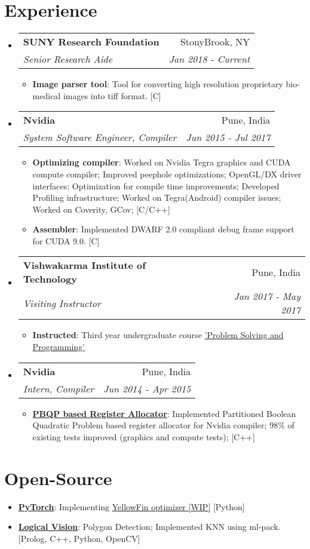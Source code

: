\documentclass[letterpaper,11pt]{article}
\makeatletter
\newcommand{\resumeItem}[2]{
  \item\small{
    \textbf{#1}{: #2 \vspace{-2pt}}
  }
}
\newcommand{\resumeSubheading}[4]{
  \vspace{-1pt}\item
    \begin{tabular*}{0.97\textwidth}{l@{\extracolsep{\fill}}r}
      \textbf{#1} & #2 \\
      \textit{\small#3} & \textit{\small #4} \\
    \end{tabular*}\vspace{-5pt}
}
\newcommand{\resumeSubItem}[2]{\resumeItem{#1}{#2}\vspace{-4pt}}
\newcommand{\resumeSubHeadingListStart}{\begin{itemize}[leftmargin=*]}
\newcommand{\resumeSubHeadingListEnd}{\end{itemize}}
\newcommand{\resumeItemListStart}{\begin{itemize}}
\newcommand{\resumeItemListEnd}{\end{itemize}\vspace{-5pt}}
\makeatother
\begin{document}
\section{Experience}
  \resumeSubHeadingListStart
  \resumeSubheading
      {SUNY Research Foundation}{StonyBrook, NY}
      {Senior Research Aide}{Jan 2018 - Current}
      \resumeItemListStart
        \resumeItem{Image parser tool}{Tool for converting high resolution proprietary bio-medical images into tiff format. [C]}
      \resumeItemListEnd
    \resumeSubheading
      {Nvidia}{Pune, India}
      {System Software Engineer, Compiler}{Jun 2015 - Jul 2017}
      \resumeItemListStart
        \resumeItem{Optimizing compiler} {Worked on Nvidia Tegra graphics and CUDA compute compiler; Improved peephole optimizations; OpenGL/DX driver interfaces; Optimization for compile time improvements; Developed Profiling infrastructure; Worked on Tegra(Android) compiler issues; Worked on Coverity, GCov; [C/C++]}
        \resumeItem{Assembler}{Implemented DWARF 2.0 compliant debug frame support for CUDA 9.0. [C]}
      \resumeItemListEnd
    \resumeSubheading
      {Vishwakarma Institute of Technology}{Pune, India}
      {Visiting Instructor}{Jan 2017 - May 2017}
      \resumeItemListStart
        \resumeItem {Instructed}
           {Third year undergraduate course \href{https://www.hackerrank.com/coding-puzzles/}{'Problem Solving and Programming'}}
      \resumeItemListEnd
    \resumeSubheading
      {Nvidia}{Pune, India}
      {Intern, Compiler}{Jun 2014 - Apr 2015}
      \resumeItemListStart
        \resumeItem{\href{http://slides.com/bhushansonawane/deck/}{ PBQP based Register Allocator}}{Implemented Partitioned Boolean Quadratic Problem based register allocator for Nvidia compiler; 98\% of existing tests improved (graphics and compute tests); [C++]}
      \resumeItemListEnd
  \resumeSubHeadingListEnd

\section{Open-Source}
\resumeItemListStart
\resumeSubItem{\href{https://github.com/pytorch/pytorch}{PyTorch}}{Implementing \href{https://arxiv.org/pdf/1706.03471.pdf}{YellowFin optimizer [WIP]} [Python]}
\resumeSubItem{\href{https://github.com/bhushan23/LogicalVision2}{Logical Vision}} {Polygon Detection; Implemented KNN using ml-pack. [Prolog, C++, Python, OpenCV]}
\resumeItemListEnd
\end{document}
